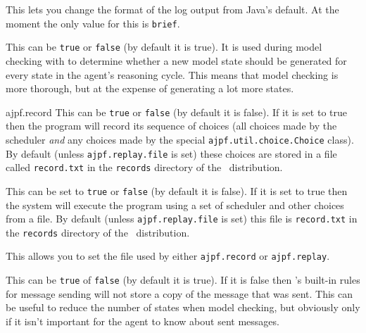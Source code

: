 \begin{description}
\item[log.format] This lets you change the format of the log output from Java's default.  At the moment the only value for this is \texttt{brief}.
\item[ajpf.transition\_every\_reasoning\_cycle] This can be \texttt{true} or \texttt{false} (by default it is true).  It is used during model checking with \ajpf{} to determine whether a new model state should be generated for every state in the agent's reasoning cycle.  This means that model checking is more thorough, but at the expense of generating a lot more states.
\begin{sloppypar}
\item[ajpf.record] This can be \texttt{true} or \texttt{false} (by default  it is false).  If it is set to true then the program will record its sequence of choices (all choices made by the scheduler \emph{and} any choices made by the special \texttt{ajpf.util.choice.Choice} class).  By default (unless \texttt{ajpf.replay.file} is set) these choices are stored in a file called \texttt{record.txt} in the \texttt{records} directory of the \mcapl\ distribution.
\end{sloppypar}
\item[ajpf.replay] This can be set to \texttt{true} or \texttt{false} (by default it is false).  If it is set to true then the system will execute the program using a set of scheduler and other choices from a file.  By default (unless \texttt{ajpf.replay.file} is set) this  file is  \texttt{record.txt} in the \texttt{records} directory of the \mcapl\ distribution.
\item[ajpf.replay.file] This allows you to set the file used by either \texttt{ajpf.record} or \texttt{ajpf.replay}.
\item[ail.store\_sent\_messages]  This can be \texttt{true} of \texttt{false} (by default it is true).  If it is false then \ail{}'s built-in rules for message sending will not store a copy of the message that was sent.  This can be useful to reduce the number of states when model checking, but obviously only if it isn't important for the agent to know about sent messages.
\end{description}

